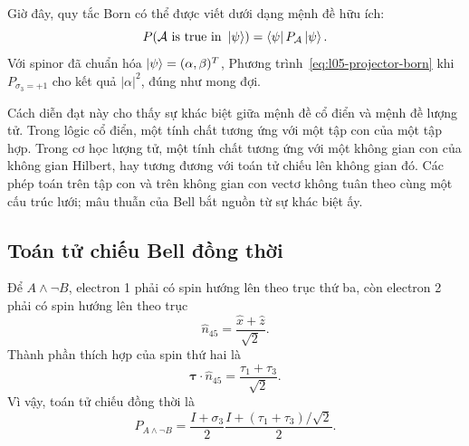 Giờ đây, quy tắc Born có thể được viết dưới dạng mệnh đề hữu ích:
\begin{equation}
  P(\mathcal A\text{ is true in }\left\lvert\psi\right\rangle)
  =
  \left\langle\psi\right\rvert P_{\mathcal A}\left\lvert\psi\right\rangle.
  \label{eq:l05-projector-born}
\end{equation}
Với spinor đã chuẩn hóa \(\left\lvert\psi\right\rangle=(\alpha,\beta)^T\), Phương trình~\eqref{eq:l05-projector-born} khi \(P_{\sigma_3=+1}\) cho kết quả \(|\alpha|^2\), đúng như mong đợi.

Cách diễn đạt này cho thấy sự khác biệt giữa mệnh đề cổ điển và mệnh đề lượng tử. Trong lôgic cổ điển, một tính chất tương ứng với một tập con của một tập hợp. Trong cơ học lượng tử, một tính chất tương ứng với một không gian con của không gian Hilbert, hay tương đương với toán tử chiếu lên không gian đó. Các phép toán trên tập con và trên không gian con vectơ không tuân theo cùng một cấu trúc lưới; mâu thuẫn của Bell bắt nguồn từ sự khác biệt ấy.

\subsection{Toán tử chiếu Bell đồng thời}

Để \(A\wedge\neg B\), electron 1 phải có spin hướng lên theo trục thứ ba, còn electron 2 phải có spin hướng lên theo trục
\begin{equation}
  \hat n_{45}=\frac{\hat x+\hat z}{\sqrt2}.
\end{equation}
Thành phần thích hợp của spin thứ hai là
\begin{equation}
  \boldsymbol{\tau}\cdot\hat n_{45}
  =
  \frac{\tau_1+\tau_3}{\sqrt2}.
\end{equation}
Vì vậy, toán tử chiếu đồng thời là
\begin{equation}
  P_{A\wedge\neg B}
  =
  \frac{I+\sigma_3}{2}
  \frac{I+(\tau_1+\tau_3)/\sqrt2}{2}.
  \label{eq:l05-joint-projector}
\end{equation}

\begin{classroomqa}
\end{classroomqa}

\begin{classroomqa}
\end{classroomqa}

